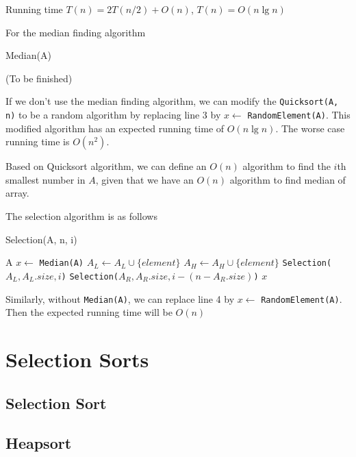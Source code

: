 				Running time $T(n) = 2T(n/2) + O(n)$, $T(n) = O(n\lg n)$

				For the median finding algorithm
				\begin{algorithm}[h]
					\caption{Median(A)}
					\begin{algorithmic}[1]
						\State (To be finished)
					\end{algorithmic}
				\end{algorithm}

				If we don't use the median finding algorithm, we can modify the \texttt{Quicksort(A, n)} to be a random algorithm by replacing line 3 by $x \gets$ \texttt{RandomElement(A)}. This modified algorithm has an expected running time of $O(n\lg n)$. The worse case running time is $O(n^2)$.

				Based on Quicksort algorithm, we can define an $O(n)$ algorithm to find the $i$th smallest number in $A$, given that we have an $O(n)$ algorithm to find median of array.

				The selection algorithm is as follows
				\begin{algorithm}[h]
					\caption{Selection(A, n, i)}
					\begin{algorithmic}[1]
							\State \Return A
						\Else
							\State $x \gets$ \texttt{Median(A)}
									\State $A_L \gets A_L \cup \{element\}$
								\Else
									\State $A_H \gets A_H \cup \{element\}$
								\EndIf
							\EndFor
								\State \Return \texttt{Selection($A_L, A_L.size, i$)}
								\State \Return \texttt{Selection($A_R, A_R.size, i - (n - A_R.size)$)}
							\Else
								\State \Return $x$
							\EndIf
						\EndIf
					\end{algorithmic}
				\end{algorithm}

				Similarly, without \texttt{Median(A)}, we can replace line 4 by $x \gets$ \texttt{RandomElement(A)}. Then the expected running time will be $O(n)$

		\section{Selection Sorts}
			\subsection{Selection Sort}

			\subsection{Heapsort}

